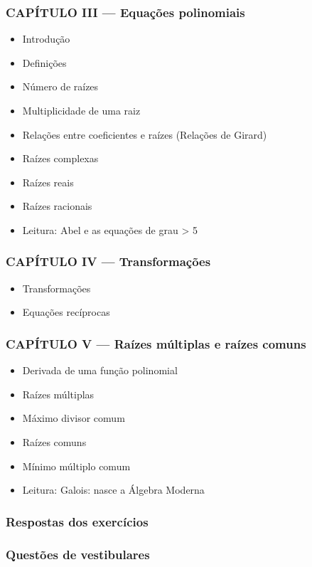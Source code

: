 \documentclass[a4paper,12pt]{article}[abntex2]
\begin{document}
\subsubsection*{CAPÍTULO III — Equações polinomiais}

\begin{itemize}
\item Introdução
\item Definições
\item Número de raízes
\item Multiplicidade de uma raiz
\item Relações entre coeficientes e raízes (Relações de Girard)
\item Raízes complexas
\item Raízes reais
\item Raízes racionais
\item Leitura: Abel e as equações de grau > 5
\end{itemize}
\subsubsection*{CAPÍTULO IV — Transformações}

\begin{itemize}
\item Transformações
\item Equações recíprocas
\end{itemize}
\subsubsection*{CAPÍTULO V — Raízes múltiplas e raízes comuns}

\begin{itemize}
\item Derivada de uma função polinomial
\item Raízes múltiplas
\item Máximo divisor comum
\item Raízes comuns
\item Mínimo múltiplo comum
\item Leitura: Galois: nasce a Álgebra Moderna
\end{itemize}
\subsubsection*{Respostas dos exercícios}

\subsubsection*{Questões de vestibulares}
\end{document}
